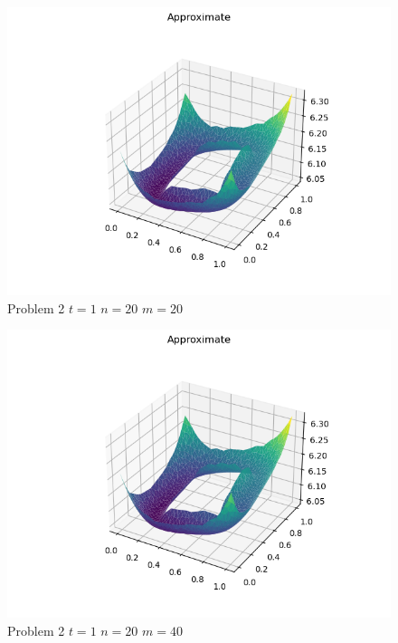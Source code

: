 \documentclass{report}
\begin{document}
\begin{figure}[h]
	\caption{Problem 2 $t = 1$ $n = 20$ $m = 20$}
	\includegraphics[width=\textwidth]{example.png}
\end{figure}
\begin{figure}[h]
	\caption{Problem 2 $t = 1$ $n = 20$ $m = 40$}
	\includegraphics[width=\textwidth]{example.png}
\end{figure}
\end{document}
